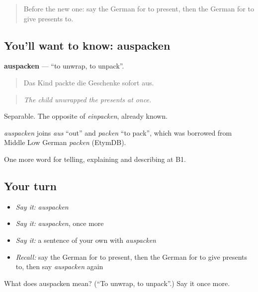 \label{lesson:GE-C306-auspacken}



\begin{quote}
Before the new one: say the German for to present, then the German for to give presents to.
\end{quote}

\subsection*{You'll want to know: auspacken}
\textbf{auspacken} — \textquotedblleft{}to unwrap, to unpack\textquotedblright{}.

\begin{quote}
Das Kind packte die Geschenke sofort aus.
\end{quote}

\begin{quote}
\emph{The child unwrapped the presents at once.}
\end{quote}

Separable. The opposite of \emph{einpacken}, already known.

\begin{cousinweb}
\emph{auspacken} joins \emph{aus} \textquotedblleft{}out\textquotedblright{} and \emph{packen} \textquotedblleft{}to pack\textquotedblright{}, which was borrowed from Middle Low German \emph{packen} (EtymDB).
\end{cousinweb}

\begin{grammarlens}[title={What you've built}]
One more word for telling, explaining and describing at B1.
\end{grammarlens}

\subsection*{Your turn}
\begin{itemize}
\raggedright
  \item \emph{Say it:} \emph{auspacken}
  \item \emph{Say it:} \emph{auspacken}, once more
  \item \emph{Say it:} a sentence of your own with \emph{auspacken}
  \item \emph{Recall:} say the German for to present, then the German for to give presents to, then say \emph{auspacken} again
\end{itemize}

\begin{tcolorbox}[breakable,colback=teal!4,colframe=teal!35!black,title={Before you move on}]
What does auspacken mean? (\textquotedblleft{}To unwrap, to unpack\textquotedblright{}.) Say it once more.
\end{tcolorbox}
